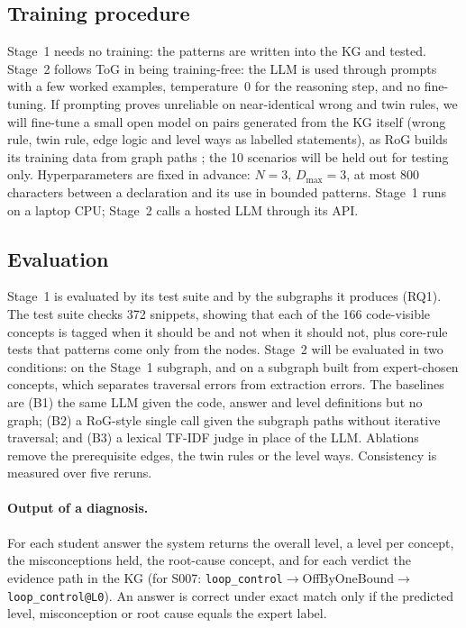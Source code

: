 \documentclass[sigconf,nonacm]{acmart}
\newcommand{\code}[1]{\texttt{#1}}
\begin{document}
\subsection{Training procedure}
Stage~1 needs no training: the patterns are written into the KG and tested. Stage~2 follows ToG in being
training-free: the LLM is used through prompts with a few worked examples, temperature~0 for the reasoning step,
and no fine-tuning. If prompting proves unreliable on near-identical wrong and twin rules, we will fine-tune a small
open model on pairs generated from the KG itself (wrong rule, twin rule, edge logic and level ways as labelled
statements), as RoG builds its training data from graph paths \cite{luo2024rog}; the 10 scenarios will be held
out for testing only. Hyperparameters are fixed in advance: $N=3$, $D_{\max}=3$, at most 800 characters between a
declaration and its use in bounded patterns. Stage~1 runs on a laptop CPU; Stage~2 calls a hosted LLM through its API.

\subsection{Evaluation}
Stage~1 is evaluated by its test suite and by the subgraphs it produces (RQ1). The test suite checks 372 snippets,
showing that each of the 166 code-visible concepts is tagged when it should be and not when it should not, plus core-rule
tests that patterns come only from the nodes. Stage~2 will be evaluated in two conditions: on the Stage~1 subgraph,
and on a subgraph built from expert-chosen concepts, which separates traversal errors from extraction errors. The
baselines are (B1) the same LLM given the code, answer and level definitions but no graph; (B2) a RoG-style single call
given the subgraph paths without iterative traversal; and (B3) a lexical TF-IDF judge in place of the LLM. Ablations
remove the prerequisite edges, the twin rules or the level ways. Consistency is measured over five reruns.

\paragraph{Output of a diagnosis.} For each student answer the system returns the overall level, a level per concept,
the misconceptions held, the root-cause concept, and for each verdict the evidence path in the KG (for S007:
\code{loop\_control}$\to$OffByOneBound$\to$\code{loop\_control@L0}). An answer is correct under exact match only if the
predicted level, misconception or root cause equals the expert label.
\end{document}

